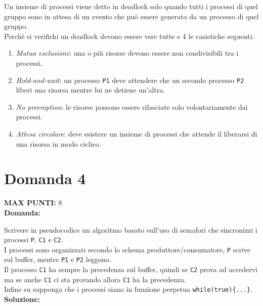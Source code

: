 \documentclass{article}
\begin{document}
    Un insieme di processi viene detto in deadlock solo quando tutti i processi di quel gruppo sono in attesa di un evento che può essere generato da un processo di quel gruppo.\\
    Perchè si verifichi un deadlock devono essere vere tutte e 4 le casistiche seguenti:
    \begin{enumerate}
        \item \emph{Mutua esclusione}: una o più risorse devono essere non condivisibili tra i processi.
        \item \emph{Hold-and-wait}: un processo \verb+P1+ deve attendere che un secondo processo \verb+P2+ liberi una risorsa mentre lui ne detiene un'altra.
        \item \emph{No preemption}: le risorse possono essere rilasciate solo volontariamente dai processi.
        \item \emph{Attesa circolare}: deve esistere un insieme di processi che attende il liberarsi di una risorsa in modo ciclico.
    \end{enumerate}
    \section*{Domanda 4}
    \textbf{MAX PUNTI:} 8\\
    \textbf{Domanda:}


    Scrivere in pseudocodice un algoritmo basato sull'uso di semafori che sincronizzi i processi \verb+P+, \verb+C1+ e \verb+C2+.\\
   I processi sono organizzati secondo lo schema produttore/consumatore, \verb+P+ scrive sul buffer, mentre \verb+P1+ e \verb+P2+ leggono.\\
    Il processo \verb+C1+ ha sempre la precedenza sul buffer, quindi se \verb+C2+ prova ad accedervi ma se anche \verb+C1+ ci sta provando allora \verb+C1+ ha la precedenza.\\
    Infine su supponga che i processi siano in funzione perpetua \verb+while(true){...}+.\\
    \textbf{Soluzione:}
\end{document}
